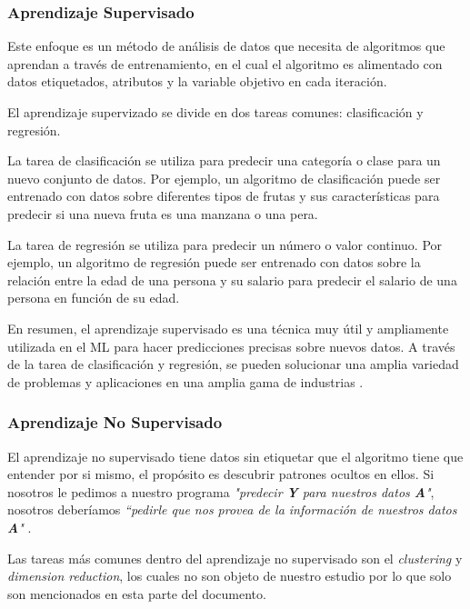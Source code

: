\subsubsection{Aprendizaje Supervisado}
Este enfoque es un método de análisis de datos que necesita de algoritmos que aprendan a través de entrenamiento, en el cual el algoritmo es alimentado con datos etiquetados, atributos y la variable objetivo en cada iteración.\\
\par El aprendizaje supervizado se divide en dos tareas comunes: clasificación y regresión.\\
\par La tarea de clasificación se utiliza para predecir una categoría o clase para un nuevo conjunto de datos. Por ejemplo, un algoritmo de clasificación puede ser entrenado con datos sobre diferentes tipos de frutas y sus características para predecir si una nueva fruta es una manzana o una pera.\\
\par La tarea de regresión se utiliza para predecir un número o valor continuo. Por ejemplo, un algoritmo de regresión puede ser entrenado con datos sobre la relación entre la edad de una persona y su salario para predecir el salario de una persona en función de su edad.\\
\par En resumen, el aprendizaje supervisado es una técnica muy útil y ampliamente utilizada en el ML para hacer predicciones precisas sobre nuevos datos. A través de la tarea de clasificación y regresión, se pueden solucionar una amplia variedad de problemas y aplicaciones en una amplia gama de industrias \cite{murdoch2019interpretable}. \\


\doublespacing
\subsubsection{Aprendizaje No Supervisado}
El aprendizaje no supervisado tiene datos sin etiquetar que el algoritmo tiene que entender por si mismo, el propósito es descubrir patrones ocultos en ellos. Si nosotros le pedimos a nuestro programa \textit{"predecir \textbf{Y} para nuestros datos \textbf{A}"},  nosotros deberíamos \textit{“pedirle que nos provea de la información de nuestros datos \textbf{A}"} \cite{murdoch2019interpretable}.\\
\par Las tareas más comunes dentro del aprendizaje no supervisado son el \emph{clustering} y \emph{dimension reduction}, los cuales no son objeto de nuestro estudio por lo que solo son mencionados en esta parte del documento.\\


